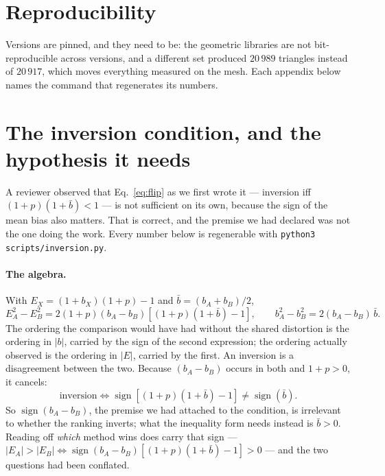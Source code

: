 \documentclass{article}
\begin{document}



\appendix

\section{Reproducibility}
\label{app:repro}

Versions are pinned, and they need to be: the geometric libraries are not bit-reproducible across
versions, and a different set produced $20\,989$ triangles instead of $20\,917$, which moves
everything measured on the mesh. Each appendix below names the command that regenerates its
numbers.

\section{The inversion condition, and the hypothesis it needs}
\label{app:flip}

A reviewer observed that Eq.~\eqref{eq:flip} as we first wrote it --- inversion iff
$(1+p)(1+\bar b) < 1$ --- is not sufficient on its own, because the sign of the mean bias also
matters. That is correct, and the premise we had declared was not the one doing the work. Every
number below is regenerable with \texttt{python3 scripts/inversion.py}.

\paragraph{The algebra.} With $E_X = (1+b_X)(1+p) - 1$ and $\bar b = (b_A+b_B)/2$,
\begin{equation}
  E_A^2 - E_B^2 = 2(1+p)(b_A-b_B)\left[(1+p)(1+\bar b) - 1\right],
  \qquad
  b_A^2 - b_B^2 = 2(b_A-b_B)\,\bar b .
  \label{eq:flipid}
\end{equation}
The ordering the comparison would have had without the shared distortion is the ordering in $|b|$,
carried by the sign of the second expression; the ordering actually observed is the ordering in
$|E|$, carried by the first. An inversion is a disagreement between the two. Because $(b_A-b_B)$
occurs in both and $1+p>0$, it cancels:
\[
  \text{inversion} \iff
  \operatorname{sign}\!\left[(1+p)(1+\bar b) - 1\right] \neq \operatorname{sign}(\bar b) .
\]
So $\operatorname{sign}(b_A-b_B)$, the premise we had attached to the condition, is irrelevant to
whether the ranking inverts; what the inequality form needs instead is $\bar b > 0$. Reading off
\emph{which} method wins does carry that sign ---
$|E_A| > |E_B| \iff \operatorname{sign}(b_A-b_B)\left[(1+p)(1+\bar b)-1\right] > 0$ --- and the two
questions had been conflated.
\end{document}

